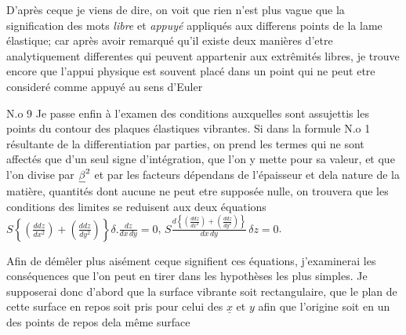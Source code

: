 \documentclass[11pt,a4paper]{article}
\begin{document}
D'après ceque je viens de dire, on voit que rien n'est plus vague
que la signification des mots \emph{libre} et \emph{appuyé} appliqués aux
differens points de la lame élastique; car après avoir \struck{\ill{}} remarqué
qu'il existe deux manières d'etre analytiquement differentes qui
peuvent appartenir aux extrêmités libres, je trouve encore que
l'appui physique est souvent placé dans un point qui ne
peut etre consideré comme appuyé au sens d'Euler

N.o 9 Je passe enfin à l'examen des conditions auxquelles sont
assujettis les points du contour des plaques élastiques vibrantes.
Si dans la formule N.o 1 résultante de la differentiation par
parties, on prend les termes qui ne sont affectés que d'un
seul signe d'intégration, que l'on y mette pour  sa
valeur, et que l'on divise par $\uncertain{\beta}^2$ et par les facteurs
dépendans de l'épaisseur et dela nature de la matière,
quantités  dont aucune ne peut etre supposée nulle,
on trouvera que les conditions des limites se reduisent aux
deux équations $S\left\{\left(\frac{ddz}{dx^2}\right) + \left(\frac{ddz}{dy^2}\right)\right\}\delta.\frac{dz}{dx\,dy} = 0$, $S\frac{d\left\{\left(\frac{ddz}{dx^2}\right) + \left(\frac{ddz}{dy^2}\right)\right\}}{dx\,dy}\,\delta z = 0$.

Afin de démêler plus aisément ceque signifient ces équations,
j'examinerai les conséquences que l'on peut en tirer dans les
hypothèses les plus simples. Je supposerai donc d'abord que
la surface vibrante soit rectangulaire, que le plan de cette
surface en repos soit pris pour celui des $\underline{x}$ et $y$ afin que
l'origine soit en un des points de repos dela même surface
\end{document}
